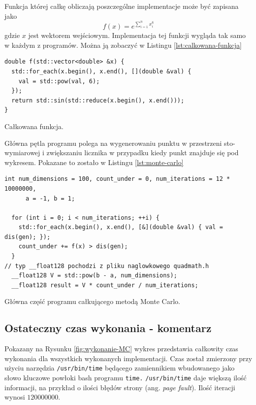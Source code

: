 \documentclass[a4paper,12pt]{book} %
\begin{document}
Funkcja której całkę obliczają poszczególne implementacje może być zapisana jako 
$$ f(x) = e^{\sum^n_{i=1}x_i^6} $$ gdzie $x$ jest wektorem wejściowym.
Implementacja tej funkcji wygląda tak samo w każdym z programów. Można ją zobaczyć w Listingu \ref{lst:calkowana-funkcja}

\begin{lstfloat}
\lstset{language=C++}
\begin{lstlisting}[frame=single]
double f(std::vector<double> &x) {
  std::for_each(x.begin(), x.end(), [](double &val) {
    val = std::pow(val, 6);
  });
  return std::sin(std::reduce(x.begin(), x.end()));
}
\end{lstlisting}
\caption{Całkowana funkcja.}
\label{lst:calkowana-funkcja}
\end{lstfloat}

Główna pętla programu polega na wygenerowaniu punktu w przestrzeni sto-wymiarowej i zwiększaniu licznika w przypadku kiedy punkt znajduje się pod wykresem. Pokazane to zostało w Listingu \ref{lst:monte-carlo}

\begin{lstfloat}
\lstset{language=C++}
\begin{lstlisting}[frame=single]
  int num_dimensions = 100, count_under = 0, num_iterations = 12 * 10000000,
      a = -1, b = 1;

  for (int i = 0; i < num_iterations; ++i) {
    std::for_each(x.begin(), x.end(), [&](double &val) { val = dis(gen); });
    count_under += f(x) > dis(gen);
  }
// typ __float128 pochodzi z pliku naglowkowego quadmath.h
  __float128 V = std::pow(b - a, num_dimensions);
  __float128 result = V * count_under / num_iterations;
\end{lstlisting}
\caption{Główna część programu całkującego metodą Monte Carlo.}
\label{lst:monte-carlo}
\end{lstfloat}

\subsection{Ostateczny czas wykonania - komentarz}
Pokazany na Rysunku \ref{fig:wykonanie-MC} wykres przedstawia całkowity czas wykonania dla wszystkich wykonanych implementacji. Czas został zmierzony przy użyciu narzędzia \texttt{/usr/bin/time} będącego zamiennikiem wbudowanego jako słowo kluczowe powłoki bash programu \texttt{time.} \texttt{/usr/bin/time} daje większą ilość informacji, na przykład o ilości błędów strony (ang. \emph{page fault}). Ilość iteracji wynosi $120000000.$
\end{document}
